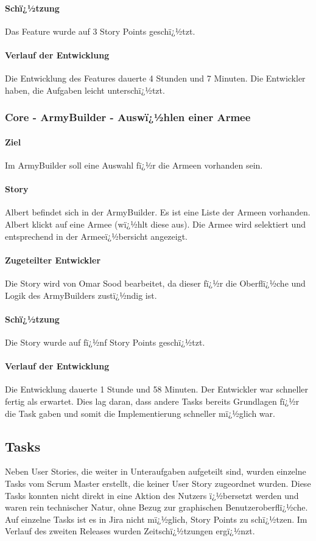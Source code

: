 \documentclass[12pt, titlepage]{scrartcl}
\begin{document}
		\paragraph{Schï¿½tzung}
		Das Feature wurde auf 3 Story Points geschï¿½tzt.
		\paragraph{Verlauf der Entwicklung} 
		Die Entwicklung des Features dauerte 4 Stunden und 7 Minuten. Die Entwickler haben, die Aufgaben leicht unterschï¿½tzt.
		
		\subsubsection{Core - ArmyBuilder - Auswï¿½hlen einer Armee}
		\paragraph{Ziel} Im ArmyBuilder soll eine Auswahl fï¿½r die Armeen vorhanden sein.
		\paragraph{Story} Albert befindet sich in der ArmyBuilder. Es ist eine Liste der Armeen vorhanden. Albert klickt auf eine Armee (wï¿½hlt diese aus). Die Armee wird selektiert und entsprechend in der Armeeï¿½bersicht angezeigt.
		\paragraph{Zugeteilter Entwickler} Die Story wird von Omar Sood bearbeitet, da dieser fï¿½r die Oberflï¿½che und Logik des ArmyBuilders zustï¿½ndig ist.
		\paragraph{Schï¿½tzung}
		Die Story wurde auf fï¿½nf Story Points geschï¿½tzt.
		\paragraph{Verlauf der Entwicklung} 
		Die Entwicklung dauerte 1 Stunde und 58 Minuten. Der Entwickler war schneller fertig als erwartet. Dies lag daran, dass andere Tasks bereits Grundlagen fï¿½r die Task gaben und somit die Implementierung schneller mï¿½glich war.
		\subsection{Tasks}
		Neben User Stories, die weiter in Unteraufgaben aufgeteilt sind, wurden einzelne Tasks vom Scrum Master erstellt, die keiner User Story zugeordnet wurden. Diese Tasks konnten nicht direkt in eine Aktion des Nutzers ï¿½bersetzt werden und waren rein technischer Natur, ohne Bezug zur graphischen Benutzeroberflï¿½che. Auf einzelne Tasks ist es in Jira nicht mï¿½glich, Story Points zu schï¿½tzen. Im Verlauf des zweiten Releases wurden Zeitschï¿½tzungen ergï¿½nzt.
\end{document}
